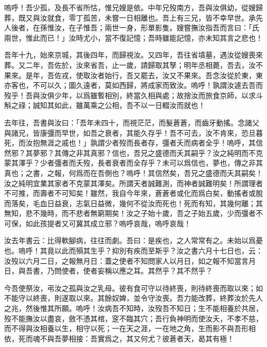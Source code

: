 嗚呼！吾少孤，及長不省所怙，惟兄嫂是依。中年兄歿南方，吾與汝俱幼，從嫂歸葬，既又與汝就食，零丁孤苦，未嘗一日相離也。吾上有三兄，皆不幸早世。承先人後者，在孫惟汝，在子惟吾；兩世一身，形單影隻。嫂嘗撫汝指吾而言曰：「氏兩世，惟此而已！」汝時尤小，當不復記憶；吾時雖能記憶，亦未知其言之悲也！

吾年十九，始來京城，其後四年，而歸視汝。又四年，吾往省墳墓，遇汝從嫂喪來葬。又二年，吾佐於，汝來省吾，止一歲，請歸取其孥；明年丞相薨，吾去，汝不果來。是年，吾佐戎，使取汝者始行，吾又罷去，汝又不果來。吾念汝從於東，東亦客也，不可以久；圖久遠者，莫如西歸，將成家而致汝。嗚呼！孰謂汝遽去吾而歿乎！吾與汝俱少年，以爲雖暫相別，終當久相與處；故捨汝而旅食京師，以求斗斛之祿；誠知其如此，雖萬乘之公相，吾不以一日輟汝而就也！

去年往，吾書與汝曰：「吾年未四十，而視茫茫，而髮蒼蒼，而齒牙動搖。念諸父與諸兄，皆康彊而早世，如吾之衰者，其能久存乎！吾不可去，汝不肯來，恐旦暮死，而汝抱無涯之戚也！」孰謂少者歿而長者存，彊者夭而病者全乎！嗚呼，其信然邪？其夢邪？其傳之非其真邪？信也，吾兄之盛德而夭其嗣乎？汝之純明而不克蒙其澤乎？少者彊者而夭歿，長者衰者而全存乎？未可以爲信也，夢也，傳之非其真也；之書，之報，何爲而在吾側也？嗚呼！其信然矣，吾兄之盛德而夭其嗣矣！汝之純明宜業其家者不克蒙其澤矣。所謂天者誠難測，而神者誠難明矣！所謂理者不可推，而壽者不可知矣！雖然，我自今年來，蒼蒼者或化而爲白矣，動搖者或脫而落矣，毛血日益衰，志氣日益微，幾何不從汝而死也！死而有知，其幾何離；其無知，悲不幾時，而不悲者無窮期矣！汝之子始十歲，吾之子始五歲，少而彊者不可保，如此孩提者又可冀其成立邪？嗚呼哀哉，嗚呼哀哉！

汝去年書云：比得軟腳病，往往而劇。吾曰：是疾也，之人常常有之。未始以爲憂也。嗚呼！其竟以此而殞其生乎？抑別有疾而至斯乎？汝之書六月十七日也，云：汝歿以六月二日，之報無月日：蓋之使者不知問家人以月日，如之報不知當言月日，與吾書，乃問使者，使者妄稱以應之耳。其然乎？其不然乎？

今吾使祭汝，弔汝之孤與汝之乳母。彼有食可守以待終喪，則待終喪而取以來；如不能守以終喪，則遂取以來。其餘奴婢，並令守汝喪。吾力能改葬，終葬汝於先人之兆，然後惟其所願。嗚呼！汝病吾不知時，汝歿吾不知日；生不能相養於共居，歿不能撫汝以盡哀，斂不憑其棺，窆不臨其穴；吾行負神明而使汝夭，不孝不慈，而不得與汝相養以生，相守以死；一在天之涯，一在地之角，生而影不與吾形相依，死而魂不與吾夢相接：吾實爲之，其又何尤？彼蒼者天，曷其有極！

